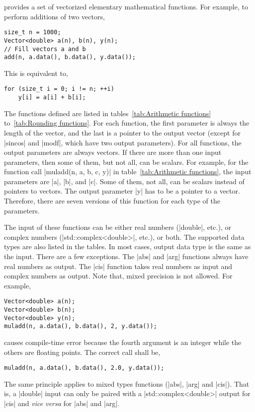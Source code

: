 \mckl provides a set of vectorized elementary mathematical functions. For
example, to perform additions of two vectors,
\begin{verbatim}
size_t n = 1000;
Vector<double> a(n), b(n), y(n);
// Fill vectors a and b
add(n, a.data(), b.data(), y.data());
\end{verbatim}
This is equivalent to,
\begin{verbatim}
for (size_t i = 0; i != n; ++i)
    y[i] = a[i] + b[i];
\end{verbatim}
The functions defined are listed in tables~\ref{tab:Arithmetic functions}
to~\ref{tab:Rounding functions}. For each function, the first parameter is
always the length of the vector, and the last is a pointer to the output vector
(except for |sincos| and |modf|, which have two output parameters). For all
functions, the output parameters are always vectors. If there are more than one
input parameters, then some of them, but not all, can be scalars. For example,
for the function call |muladd(n, a, b, c, y)| in table~\ref{tab:Arithmetic
  functions}, the input parameters are |a|, |b|, and |c|. Some of them, not
all, can be scalars instead of pointers to vectors. The output parameter |y|
has to be a pointer to a vector. Therefore, there are seven versions of this
function for each type of the parameters.

The input of these functions can be either real numbers (|double|, etc.), or
complex numbers (|std::complex<double>|, etc.), or both. The supported data
types are also listed in the tables. In most cases, output data type is the
same as the input. There are a few exceptions. The |abs| and |arg| functions
always have real numbers as output. The |cis| function takes real numbers as
input and complex numbers as output. Note that, mixed precision is not allowed.
For example,
\begin{verbatim}
Vector<double> a(n);
Vector<double> b(n);
Vector<double> y(n);
muladd(n, a.data(), b.data(), 2, y.data());
\end{verbatim}
causes compile-time error because the fourth argument is an integer while the
others are floating points. The correct call shall be,
\begin{verbatim}
muladd(n, a.data(), b.data(), 2.0, y.data());
\end{verbatim}
The same principle applies to mixed types functions (|abs|, |arg| and |cis|).
That is, a |double| input can only be paired with a |std::complex<double>|
output for |cis| and \emph{vice versa} for |abs| and |arg|.

